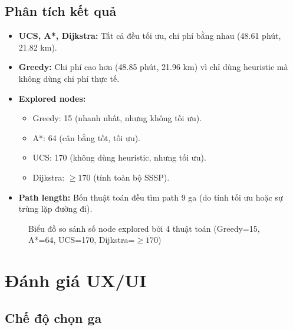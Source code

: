 \subsection{Phân tích kết quả}

\begin{itemize}
  \item \textbf{UCS, A*, Dijkstra:} Tất cả đều tối ưu, chi phí bằng nhau (48.61 phút, 21.82 km).

  \item \textbf{Greedy:} Chi phí cao hơn (48.85 phút, 21.96 km) vì chỉ dùng heuristic mà không dùng chi phí thực tế.

  \item \textbf{Explored nodes:}
    \begin{itemize}
      \item Greedy: 15 (nhanh nhất, nhưng không tối ưu).
      \item A*: 64 (cân bằng tốt, tối ưu).
      \item UCS: 170 (không dùng heuristic, nhưng tối ưu).
      \item Dijkstra: $\geq 170$ (tính toàn bộ SSSP).
    \end{itemize}

  \item \textbf{Path length:} Bốn thuật toán đều tìm path 9 ga (do tính tối ưu hoặc sự trùng lặp đường đi).
\end{itemize}

\begin{figure}[H]
  \centering
  \caption{Biểu đồ so sánh số node explored bởi 4 thuật toán (Greedy=15, A*=64, UCS=170, Dijkstra=$\geq 170$)}
  \label{fig:benchmark-chart}
\end{figure}

\section{Đánh giá UX/UI}

\subsection{Chế độ chọn ga}

